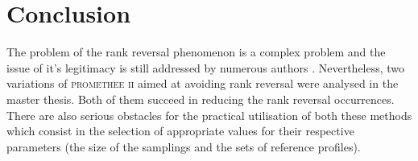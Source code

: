 \documentclass[conference,compsoc]{IEEEtran}
\begin{document}




\section{Conclusion}
The problem of the rank reversal phenomenon is a complex problem and the issue of it's legitimacy is still addressed by numerous authors \cite{Brans2016}. 
Nevertheless, two variations of \textsc{promethee ii} aimed at avoiding rank reversal were analysed in the master thesis. Both of them succeed in reducing the rank reversal occurrences. There are also serious obstacles for the practical utilisation of  both these methods which consist in the selection of appropriate values for their respective parameters (the size of the samplings and the sets of reference profiles).



\end{document}
